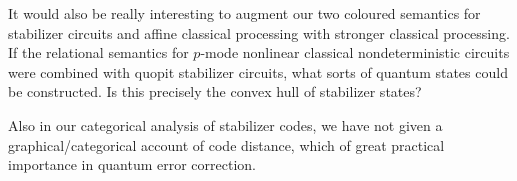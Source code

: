 It would also be really interesting to augment our two coloured semantics for stabilizer circuits and affine classical processing with stronger classical processing.  If the relational semantics for $p$-mode nonlinear classical nondeterministic circuits were combined with quopit stabilizer circuits, what sorts of quantum states could be constructed.  Is this precisely the convex hull of stabilizer states?

Also in our categorical analysis of stabilizer codes, we have not given a graphical/categorical account of code distance, which of great practical importance in quantum error correction. 







